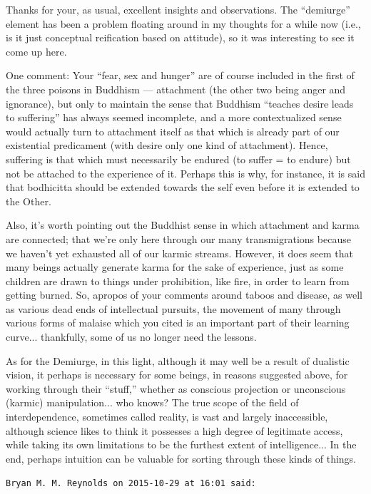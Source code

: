 \begin{footnotesize}
\begin{sffamily}
Thanks for your, as usual, excellent insights and observations. The ``demiurge'' element has been a problem floating around in my thoughts for a while now (i.e., is it just conceptual reification based on attitude), so it was interesting to see it come up here.

One comment: Your ``fear, sex and hunger'' are of course included in the first of the three poisons in Buddhism --- attachment (the other two being anger and ignorance), but only to maintain the sense that Buddhism ``teaches desire leads to suffering'' has always seemed incomplete, and a more contextualized sense would actually turn to attachment itself as that which is already part of our existential predicament (with desire only one kind of attachment). Hence, suffering is that which must necessarily be endured (to suffer = to endure) but not be attached to the experience of it. Perhaps this is why, for instance, it is said that bodhicitta should be extended towards the self even before it is extended to the Other.

Also, it's worth pointing out the Buddhist sense in which attachment and karma are connected; that we're only here through our many transmigrations because we haven't yet exhausted all of our karmic streams. However, it does seem that many beings actually generate karma for the sake of experience, just as some children are drawn to things under prohibition, like fire, in order to learn from getting burned. So, apropos of your comments around taboos and disease, as well as various dead ends of intellectual pursuits, the movement of many through various forms of malaise which you cited is an important part of their learning curve... thankfully, some of us no longer need the lessons.

As for the Demiurge, in this light, although it may well be a result of dualistic vision, it perhaps is necessary for some beings, in reasons suggested above, for working through their ``stuff,'' whether as conscious projection or unconscious (karmic) manipulation... who knows? The true scope of the field of interdependence, sometimes called reality, is vast and largely inaccessible, although science likes to think it possesses a high degree of legitimate access, while taking its own limitations to be the furthest extent of intelligence... In the end, perhaps intuition can be valuable for sorting through these kinds of things.

\hfill

\texttt{Bryan M. M. Reynolds on 2015-10-29 at 16:01 said:}


\end{sffamily}
\end{footnotesize}
